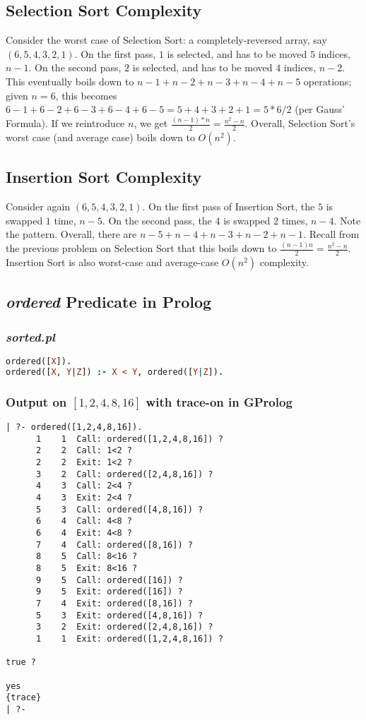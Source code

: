 \documentclass[12pt]{article}
\begin{document}
	\subsection{Selection Sort Complexity}
	Consider the worst case of Selection Sort: a completely-reversed array, say $(6, 5, 4, 3, 2, 1)$. On the first pass, $1$ is selected, and has to be moved $5$ indices, $n - 1$. On the second pass, $2$ is selected, and has to be moved $4$ indices, $n - 2$. This eventually boils down to $n - 1 + n - 2 + n - 3 + n - 4 + n - 5$ operations; given $n = 6$, this becomes $6 - 1 + 6 - 2 + 6 - 3 + 6 - 4 + 6 - 5 = 5 + 4 + 3 + 2 + 1 = 5 * 6 / 2$ (per Gauss' Formula). If we reintroduce $n$, we get $\frac{(n - 1) * n}{2} = \frac{n^2 - n}{2}$. Overall, Selection Sort's worst case (and average case) boils down to $O(n^2)$.

	\subsection{Insertion Sort Complexity}
	Consider again $(6, 5, 4, 3, 2, 1)$. On the first pass of Insertion Sort, the $5$ is swapped $1$ time, $n - 5$. On the second pass, the $4$ is swapped $2$ times, $n - 4$. Note the pattern. Overall, there are $n - 5 + n - 4 + n - 3 + n - 2 + n - 1$. Recall from the previous problem on Selection Sort that this boils down to $\frac{(n - 1)n}{2} = \frac{n^2 - n}{2}$. Insertion Sort is also worst-case and average-case $O(n^2)$ complexity.

	\subsection{\textit{ordered} Predicate in Prolog}
	\subsubsection{\textit{sorted.pl}}
	\begin{lstlisting}[language = Prolog]
ordered([X]).
ordered([X, Y|Z]) :- X < Y, ordered([Y|Z]).
	\end{lstlisting}

	\subsubsection{Output on $[1, 2, 4, 8, 16]$ with trace-on in GProlog}
	\begin{lstlisting}
| ?- ordered([1,2,4,8,16]).
      1    1  Call: ordered([1,2,4,8,16]) ?
      2    2  Call: 1<2 ?
      2    2  Exit: 1<2 ?
      3    2  Call: ordered([2,4,8,16]) ?
      4    3  Call: 2<4 ?
      4    3  Exit: 2<4 ?
      5    3  Call: ordered([4,8,16]) ?
      6    4  Call: 4<8 ?
      6    4  Exit: 4<8 ?
      7    4  Call: ordered([8,16]) ?
      8    5  Call: 8<16 ?
      8    5  Exit: 8<16 ?
      9    5  Call: ordered([16]) ?
      9    5  Exit: ordered([16]) ?
      7    4  Exit: ordered([8,16]) ?
      5    3  Exit: ordered([4,8,16]) ?
      3    2  Exit: ordered([2,4,8,16]) ?
      1    1  Exit: ordered([1,2,4,8,16]) ?

true ?

yes
{trace}
| ?-
	\end{lstlisting}
	\pagebreak
\end{document}
